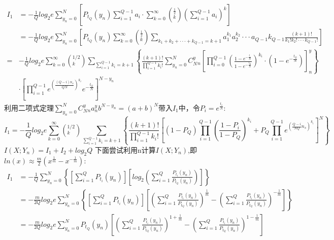 \documentclass[12pt]{article}
\begin{document}
\begin{equation*}
  \begin{aligned}
    I_1 &= -\frac{1}{Q}log_2e\sum\limits_{y_n=0}^{N}\left[P_{t_Q}(y_n)\sum\limits_{i=1}^{Q-1}a_i·\sum\limits_{k=0}^{\infty}\left(^{\frac{1}{2}}_k\right)\left(\sum\limits_{i=1}^{Q-1}a_i\right)^{k}\right] \\
    &= -\frac{1}{Q}log_2e\sum\limits_{y_n=0}^{N}\left[P_{t_Q}(y_n)\sum\limits_{k=0}^{\infty}\left(^{\frac{1}{2}}_k\right)\sum\limits_{k_1+k_2+···+k_{Q-1}=k+1}a_1^{k_1}a_2^{k_2}···a_{Q-1}k_{Q-1}\frac{(k+1)!}{k_1!k_2!···k_{Q-1}!}\right] \\
    =& -\frac{1}{Q}log_2e\sum\limits_{k=0}^{\infty}\left(^{1/2}_k\right)\sum\limits_{\sum_{i=1}^{Q-1}k_i=k+1}\left\{\frac{(k+1)!}{\prod_{i=1}^{Q-1}k_i!}\sum\limits_{y_n=0}^NC_N^y_n\left[\prod_{i=0}^{Q-1}\left(\frac{1-e^{-\frac{t_i}{N}}}{1-e^{-\frac{t_Q}{N}}}\right)^{k_i}·\left(1-e^{-\frac{t_Q}{N}}\right)\right]^y_n\right\} \\
    &·\left[\prod_{i=1}^{Q-1}e^{\left(\frac{(Q-i)n_s}{QN}\right)^{k_i}}e^{-\frac{t_Q}{N}}\right]^{N-y_n}
  \end{aligned}
\end{equation*}
利用二项式定理$\sum_{y_n=0}^NC_N^y_na^y_nb^{N-y_n}=(a+b)^N$带入$I_1$中，令$P_i=e^{\frac{t_i}{N}}$:
$$I_1=-\frac{1}{Q}log_2e\sum\limits_{k=0}^\infty\left(^{1/2}_k\right)\sum\limits_{\sum_{i=1}^{Q-1}k_i=k+1}\left\{\frac{(k+1)!}{\prod_{i=1}^{Q-1}k_i!}\left[(1-P_Q)\prod_{i=1}^{Q-1}\left(\frac{1-P_i}{1-P_Q}\right)^{k_i}+P_Q\prod_{i=1}^{Q-1}e^{\left(\frac{Q-i}{NQ}n_s\right)^{k_i}}\right]^N\right\}$$
$I(X;Y_n)=I_1+I_2+log_2Q$
下面尝试利用n计算$I(X;Y_n)$,即$ln(x)\approx\frac{m}{2}\left(x^{\frac{1}{m}}-x^{-\frac{1}{m}}\right)$:
\begin{equation*}
  \begin{aligned}
    I_1 &= -\frac{1}{Q}\sum\limits_{y_n=0}^N\left\{\left[\sum\limits_{i=1}^QP_{t_i}(y_n)\right]\left[log_2\left(\sum\limits_{i=1}^Q\frac{P_{t_i}(y_n)}{P_{t_Q}(y_n)}\right)\right]\right\} \\
    &=-\frac{m}{2Q}log_2e\sum\limits_{y_n=0}^N\left\{\left[\sum\limits_{i=1}^QP_{t_i}(y_n)\right]\left[\left(\sum\limits_{i=1}^Q\frac{P_{t_i}(y_n)}{P_{t_Q}(y_n)}\right)^{\frac{1}{m}}-\left(\sum\limits_{i=1}^Q\frac{P_{t_i}(y_n)}{P_{t_Q}(y_n)}\right)^{-\frac{1}{m}}\right]\right\} \\
    &=-\frac{m}{2Q}log_2e\sum\limits_{y_n=0}^NP_{t_Q}(y_n)\left[\left(\sum\limits_{i=1}^Q\frac{P_{t_i}(y_n)}{P_{t_Q}(y_n)}\right)^{1+\frac{1}{m}}-\left(\sum\limits_{i=1}^Q\frac{P_{t_i}(y_n)}{P_{t_Q}(y_n)}\right)^{1-\frac{1}{m}}\right]
  \end{aligned}
\end{equation*}
\end{document}
